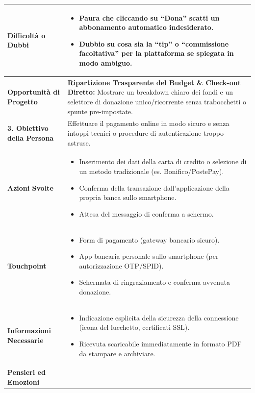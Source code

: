 \documentclass[11pt,a4paper]{article}
\begin{document}
\begin{table}[h!]
\begin{tabular}{|p{3.2cm}|p{11.8cm}|}
\textbf{Difficoltà o Dubbi} &
\begin{itemize}[leftmargin=*,nosep]
    \item Paura che cliccando su ``Dona'' scatti un abbonamento automatico indesiderato.
    \item Dubbio su cosa sia la ``tip'' o ``commissione facoltativa'' per la piattaforma se spiegata in modo ambiguo.
\end{itemize} \\ \hline
\textbf{Opportunità di Progetto} &
\textbf{Ripartizione Trasparente del Budget \& Check-out Diretto:} Mostrare un breakdown chiaro dei fondi e un selettore di donazione unico/ricorrente senza trabocchetti o spunte pre-impostate. \\ \hline
\hline
\textbf{3. Obiettivo della Persona} & Effettuare il pagamento online in modo sicuro e senza intoppi tecnici o procedure di autenticazione troppo astruse. \\ \hline
\textbf{Azioni Svolte} &
\begin{itemize}[leftmargin=*,nosep]
    \item Inserimento dei dati della carta di credito o selezione di un metodo tradizionale (es. Bonifico/PostePay).
    \item Conferma della transazione dall'applicazione della propria banca sullo smartphone.
    \item Attesa del messaggio di conferma a schermo.
\end{itemize} \\ \hline
\textbf{Touchpoint} &
\begin{itemize}[leftmargin=*,nosep]
    \item Form di pagamento (gateway bancario sicuro).
    \item App bancaria personale sullo smartphone (per autorizzazione OTP/SPID).
    \item Schermata di ringraziamento e conferma avvenuta donazione.
\end{itemize} \\ \hline
\textbf{Informazioni Necessarie} &
\begin{itemize}[leftmargin=*,nosep]
    \item Indicazione esplicita della sicurezza della connessione (icona del lucchetto, certificati SSL).
    \item Ricevuta scaricabile immediatamente in formato PDF da stampare e archiviare.
\end{itemize} \\ \hline
\textbf{Pensieri ed Emozioni} &

\end{tabular}
\end{table}
\end{document}
